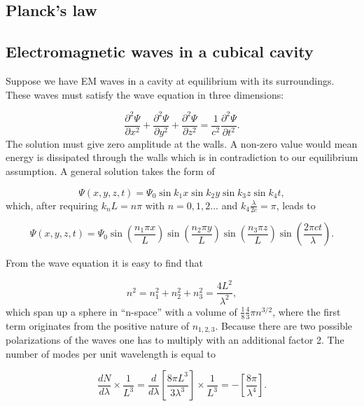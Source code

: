 \begin{appendices}
\chapter{Planck's law}
\label{ch:planck}
\section{Electromagnetic waves in a cubical cavity}
Suppose we have EM waves in a cavity at equilibrium with its surroundings. These waves must satisfy the wave equation in three dimensions:

\begin{equation}
\label{eq:wave}
\frac{\partial^2 \Psi}{\partial x^2} + \frac{\partial^2 \Psi}{\partial y^2} + \frac{\partial^2 \Psi}{\partial z^2} = \frac{1}{c^2} \frac{\partial^2 \Psi}{\partial t^2}.
\end{equation}
The solution must give zero amplitude at the walls. A non-zero value would mean energy is dissipated through the walls which is in contradiction to our equilibrium assumption. A general solution takes the form of

\begin{equation}
\Psi(x,y,z,t) = \Psi_0 \sin{k_1x} \sin{k_2y} \sin{k_3z} \sin{k_4 t},
\end{equation}
which, after requiring $k_n L = n \pi$ with $n=0,1,2...$ and $k_4 \frac{\lambda}{2c} = \pi$, leads to

\begin{equation}
\Psi(x,y,z,t) = \Psi_0 \sin{\left(\frac{n_1 \pi x}{L}\right)} \sin{\left(\frac{n_2 \pi y}{L}\right)} \sin{\left(\frac{n_3 \pi z}{L}\right)} \sin{\left(\frac{2\pi ct}{\lambda}\right)}.
\end{equation}

From the wave equation it is easy to find that

\begin{equation}
\label{eq:n}
n^2 = n_1^2 + n_2^2 + n_3^2 = \frac{4L^2}{\lambda^2},
\end{equation}
which span up a sphere in ``n-space'' with a volume of $\frac{1}{8}\frac{4}{3}\pi n^{3/2}$, where the first term originates from the positive nature of $n_{1,2,3}$. Because there are two possible polarizations of the waves one has to multiply with an additional factor 2. The number of modes per unit wavelength is equal to

\begin{equation}
\frac{dN}{d\lambda} \times \frac{1}{L^3} = \frac{d}{d\lambda}\left[\frac{8\pi L^3}{3\lambda^3}\right]  \times \frac{1}{L^3} = - \left[\frac{8\pi}{\lambda^4}\right].
\end{equation}

\end{appendices}
